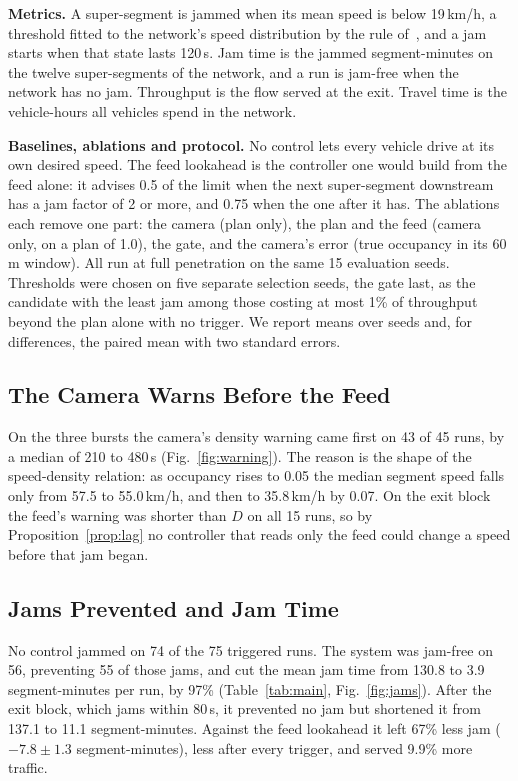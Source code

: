 \noindent\textbf{Metrics.} A super-segment is jammed when its mean speed is below 19\,km/h, a threshold fitted to the network's speed distribution by the rule of~\cite{bhardwaj2023understanding}, and a jam starts when that state lasts 120\,s. Jam time is the jammed segment-minutes on the twelve super-segments of the network, and a run is jam-free when the network has no jam. Throughput is the flow served at the exit. Travel time is the vehicle-hours all vehicles spend in the network.

\noindent\textbf{Baselines, ablations and protocol.} No control lets every vehicle drive at its own desired speed. The feed lookahead is the controller one would build from the feed alone: it advises 0.5 of the limit when the next super-segment downstream has a jam factor of 2 or more, and 0.75 when the one after it has. The ablations each remove one part: the camera (plan only), the plan and the feed (camera only, on a plan of 1.0), the gate, and the camera's error (true occupancy in its 60\,m window). All run at full penetration on the same 15 evaluation seeds. Thresholds were chosen on five separate selection seeds, the gate last, as the candidate with the least jam among those costing at most 1\% of throughput beyond the plan alone with no trigger. We report means over seeds and, for differences, the paired mean with two standard errors.

\subsection{The Camera Warns Before the Feed}
\label{sec:warn}

On the three bursts the camera's density warning came first on 43 of 45 runs, by a median of 210 to 480\,s (Fig.~\ref{fig:warning}). The reason is the shape of the speed-density relation: as occupancy rises to 0.05 the median segment speed falls only from 57.5 to 55.0\,km/h, and then to 35.8\,km/h by 0.07. On the exit block the feed's warning was shorter than $D$ on all 15 runs, so by Proposition~\ref{prop:lag} no controller that reads only the feed could change a speed before that jam began.

\subsection{Jams Prevented and Jam Time}
\label{sec:prevent}

No control jammed on 74 of the 75 triggered runs. The system was jam-free on 56, preventing 55 of those jams, and cut the mean jam time from 130.8 to 3.9 segment-minutes per run, by 97\% (Table~\ref{tab:main}, Fig.~\ref{fig:jams}). After the exit block, which jams within 80\,s, it prevented no jam but shortened it from 137.1 to 11.1 segment-minutes. Against the feed lookahead it left 67\% less jam ($-7.8\pm1.3$ segment-minutes), less after every trigger, and served 9.9\% more traffic.

